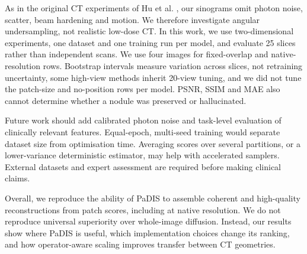 As in the original CT experiments of Hu et al. \cite{hu_learning_2024}, our sinograms omit photon noise, scatter, beam hardening and motion. We therefore investigate angular undersampling, not realistic low-dose CT. In this work, we use two-dimensional experiments, one dataset and one training run per model, and evaluate 25 slices rather than independent scans. We use four images for fixed-overlap and native-resolution rows. Bootstrap intervals measure variation across slices, not retraining uncertainty, some high-view methods inherit 20-view tuning, and we did not tune the patch-size and no-position rows per model. PSNR, SSIM and MAE also cannot determine whether a nodule was preserved or hallucinated.

Future work should add calibrated photon noise and task-level evaluation of clinically relevant features. Equal-epoch, multi-seed training would separate dataset size from optimisation time. Averaging scores over several partitions, or a lower-variance deterministic estimator, may help with accelerated samplers. External datasets and expert assessment are required before making clinical claims.

Overall, we reproduce the ability of PaDIS to assemble coherent and high-quality reconstructions from patch scores, including at native resolution. We do not reproduce universal superiority over whole-image diffusion. Instead, our results show where PaDIS is useful, which implementation choices change its ranking, and how operator-aware scaling improves transfer between CT geometries.
